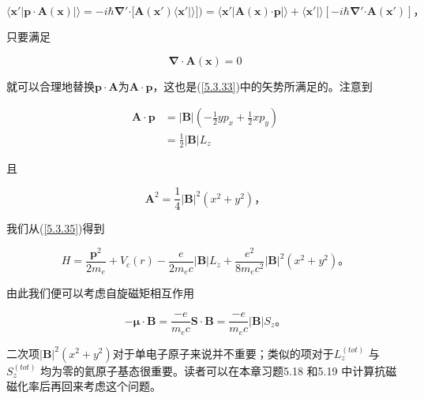 ﻿\documentclass[UTF8,twoside]{ctexart}
\begin{document}
\begin{equation} \label{5.3.36}
\langle\boldsymbol{x}'|\boldsymbol{p\cdot A}(\boldsymbol{x})|\rangle=-i\hbar\boldsymbol{\nabla}'\boldsymbol{\cdot}[\boldsymbol{A} (\boldsymbol{x}')\langle\boldsymbol{x}'|\rangle])=\langle\boldsymbol{x}'|\boldsymbol{A}(\boldsymbol{x})\boldsymbol{ \cdot p}|\rangle+\langle\boldsymbol{x}'|\rangle[-i\hbar\boldsymbol{\nabla}'\boldsymbol{\cdot A}(\boldsymbol{x}')]\text{，}
\end{equation}

\noindent 只要满足

\begin{equation} \label{5.3.37}
\boldsymbol{\nabla\cdot A}(\boldsymbol{x})=0
\end{equation}

\noindent 就可以合理地替换$\boldsymbol{p\cdot A}$为$\boldsymbol{A\cdot p}$，这也是(\ref{5.3.33})中的矢势所满足的。注意到

\begin{equation} \label{5.3.38}
\begin{split}
\boldsymbol{A\cdot p}&=|\boldsymbol{B}|(-\frac{1}{2}yp_x+\frac{1}{2}xp_y) \\
&=\frac{1}{2}|\boldsymbol{B}|L_z
\end{split}
\end{equation}

\noindent 且

\begin{equation} \label{5.3.39}
\boldsymbol{A}^2=\frac{1}{4}|\boldsymbol{B}|^2(x^2+y^2)\text{，}
\end{equation}

\noindent 我们从(\ref{5.3.35})得到

\begin{equation} \label{5.3.40}
H=\dfrac{\boldsymbol{p}^2}{2m_e}+V_c(r)-\dfrac{e}{2m_ec}|\boldsymbol{B}|L_z+ \dfrac{e^2}{8m_ec^2}|\boldsymbol{B}|^2(x^2+y^2)\text{。}
\end{equation}

\noindent 由此我们便可以考虑自旋磁矩相互作用

\begin{equation} \label{5.3.41}
-\boldsymbol{\mu\cdot B}=\dfrac{-e}{m_ec}\boldsymbol{S\cdot B}=\dfrac{-e}{m_ec}|\boldsymbol{B}|S_z\text{。}
\end{equation}

\noindent 二次项$|\boldsymbol{B}|^2(x^2+y^2)$对于单电子原子来说并不重要；类似的项对于$L_z^{(tot)}$ 与$S_z^{(tot)}$ 均为零的氦原子基态很重要。读者可以在本章习题5.18 和5.19 中计算抗磁磁化率后再回来考虑这个问题。
\end{document}
